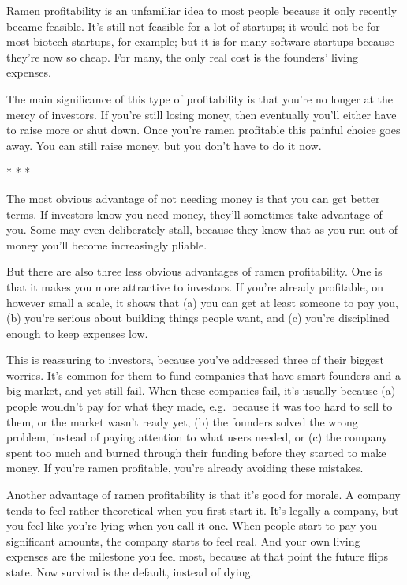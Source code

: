 \documentclass[12pt]{book}
\begin{document}
Ramen profitability is an unfamiliar idea to most people because it only
recently became feasible. It's still not feasible for a lot of startups;
it would not be for most biotech startups, for example; but it is for
many software startups because they're now so cheap. For many, the only
real cost is the founders' living expenses.

The main significance of this type of profitability is that you're no
longer at the mercy of investors. If you're still losing money, then
eventually you'll either have to raise more or shut down. Once you're
ramen profitable this painful choice goes away. You can still raise
money, but you don't have to do it now.

* * *

The most obvious advantage of not needing money is that you can get
better terms. If investors know you need money, they'll sometimes take
advantage of you. Some may even deliberately stall, because they know
that as you run out of money you'll become increasingly pliable.

But there are also three less obvious advantages of ramen profitability.
One is that it makes you more attractive to investors. If you're already
profitable, on however small a scale, it shows that (a) you can get at
least someone to pay you, (b) you're serious about building things
people want, and (c) you're disciplined enough to keep expenses low.

This is reassuring to investors, because you've addressed three of their
biggest worries. It's common for them to fund companies that have smart
founders and a big market, and yet still fail. When these companies
fail, it's usually because (a) people wouldn't pay for what they made,
e.g.~because it was too hard to sell to them, or the market wasn't ready
yet, (b) the founders solved the wrong problem, instead of paying
attention to what users needed, or (c) the company spent too much and
burned through their funding before they started to make money. If
you're ramen profitable, you're already avoiding these mistakes.

Another advantage of ramen profitability is that it's good for morale. A
company tends to feel rather theoretical when you first start it. It's
legally a company, but you feel like you're lying when you call it one.
When people start to pay you significant amounts, the company starts to
feel real. And your own living expenses are the milestone you feel most,
because at that point the future flips state. Now survival is the
default, instead of dying.
\end{document}
